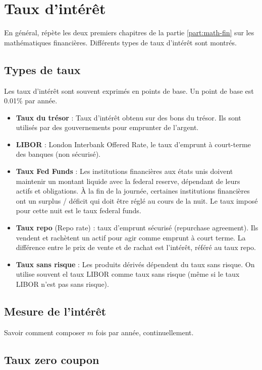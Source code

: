 \chapter{Taux d'intérêt}

En général, répète les deux premiers chapitres de la partie \ref{part:math-fin} sur les mathématiques financières. Différents types de taux d'intérêt sont montrés. 

\section{Types de taux}

Les taux d'intérêt sont souvent exprimés en points de base. Un point de base est 0.01\% par année. 

\begin{itemize}
	\item \textbf{Taux du trésor} : Taux d'intérêt obtenu sur des bons du trésor. Ils sont utilisés par des gouvernements pour emprunter de l'argent. 
	\item \textbf{LIBOR} : London Interbank Offered Rate, le taux d'emprunt à court-terme des banques (non sécurisé).
	\item \textbf{Taux Fed Funds} : Les institutions financières aux états unis doivent maintenir un montant liquide avec la federal reserve, dépendant de leurs actifs et obligations. À la fin de la journée, certaines institutions financières ont un surplus / déficit qui doit être réglé au cours de la nuit. Le taux imposé pour cette nuit est le taux federal funds. 
	\item \textbf{Taux repo} (Repo rate) : taux d'emprunt sécurisé (repurchase agreement). Ils vendent et rachètent un actif pour agir comme emprunt à court terme. La différence entre le prix de vente et de rachat est l'intérêt, référé au taux repo.
	\item \textbf{Taux sans risque} : Les produits dérivés dépendent du taux sans risque. On utilise souvent el taux LIBOR comme taux sans risque (même si le taux LIBOR n'est pas sans risque). 
\end{itemize}

\section{Mesure de l'intérêt}

Savoir comment composer $m$ fois par année, continuellement. 

\section{Taux zero coupon}

